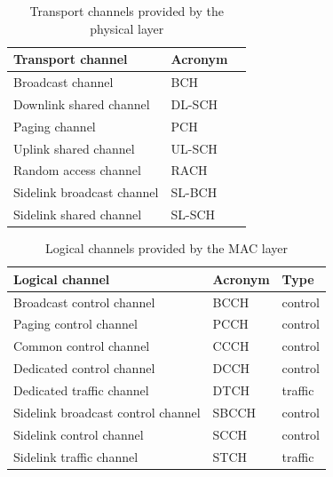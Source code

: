 \begin{table}[ht]
    \centering
    \begin{tabular}{|l|l|l|}
    \hline
    \textbf{Transport channel} & \textbf{Acronym} \\ \hline
    Broadcast channel             & BCH         \\ \hline
    Downlink shared channel       & DL-SCH      \\ \hline
    Paging channel                & PCH         \\ \hline
    Uplink shared channel         & UL-SCH      \\ \hline
    Random access channel         & RACH        \\ \hline
    Sidelink broadcast channel    & SL-BCH      \\ \hline
    Sidelink shared channel       & SL-SCH      \\ \hline
    \end{tabular}
    \caption{Transport channels provided by the physical layer \label{tab:nr_channels_phy}}
\end{table}

\begin{table}[ht]
    \centering
    \begin{tabular}{|l|l|l|}
    \hline
    \textbf{Logical channel} & \textbf{Acronym} & \textbf{Type} \\ \hline
    Broadcast control channel             & BCCH     & control     \\ \hline
    Paging control channel                & PCCH     & control     \\ \hline
    Common control channel                & CCCH     & control     \\ \hline
    Dedicated control channel             & DCCH     & control     \\ \hline
    Dedicated traffic channel             & DTCH     & traffic     \\ \hline
    Sidelink broadcast control channel    & SBCCH    & control     \\ \hline
    Sidelink control channel              & SCCH     & control     \\ \hline
    Sidelink traffic channel              & STCH     & traffic     \\ \hline
    \end{tabular}
    \caption{Logical channels provided by the MAC layer \label{tab:nr_channels_mac}}
\end{table}

